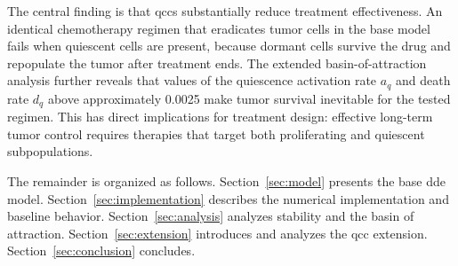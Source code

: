 The central finding is that \gls{qcc}s substantially reduce treatment effectiveness. An identical chemotherapy regimen that eradicates tumor cells in the base model fails when quiescent cells are present, because dormant cells survive the drug and repopulate the tumor after treatment ends. The extended basin-of-attraction analysis further reveals that values of the quiescence activation rate $a_q$ and death rate $d_q$ above approximately 0.0025 make tumor survival inevitable for the tested regimen. This has direct implications for treatment design: effective long-term tumor control requires therapies that target both proliferating and quiescent subpopulations.

The remainder is organized as follows. Section~\ref{sec:model} presents the base \gls{dde} model. Section~\ref{sec:implementation} describes the numerical implementation and baseline behavior. Section~\ref{sec:analysis} analyzes stability and the basin of attraction. Section~\ref{sec:extension} introduces and analyzes the \gls{qcc} extension. Section~\ref{sec:conclusion} concludes.